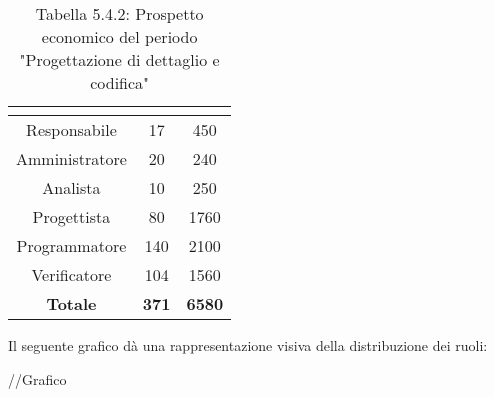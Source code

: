 \renewcommand{\arraystretch}{1.5}
\begin{table}[H]
\begin{center}
\begin{tabular}{|c|c|c|}
\hline
\rowcolor{title_row}
\textbf{\color{title_text}{Ruolo}}  & \textbf{\color{title_text}{Ore}} & \textbf{\color{title_text}{Costo in \euro}} \\ \hline
Responsabile    & 17           & 450                 \\ \hline
Amministratore  & 20           & 240                 \\ \hline
Analista        & 10           & 250                 \\ \hline
Progettista     & 80           & 1760                \\ \hline
Programmatore   & 140          & 2100                \\ \hline
Verificatore    & 104          & 1560                \\ \hline
\textbf{Totale} & \textbf{371}    & \textbf{6580}           \\ \hline
\end{tabular}
\caption{Tabella 5.4.2: Prospetto economico del periodo "Progettazione di dettaglio e codifica"\label{}}
\end{center}
\end{table}
\renewcommand{\arraystretch}{1}

Il seguente grafico dà una rappresentazione visiva della distribuzione dei ruoli: \\
\begin{center}
//Grafico
\end{center}

\pagebreak